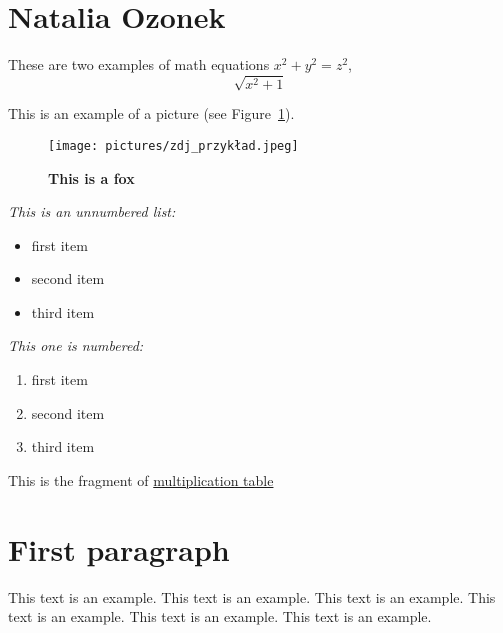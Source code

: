 \section{Natalia Ozonek}
These are two examples of math equations \(x^2 + y^2 = z^2\), \[\sqrt{x^2+1}\] 

This is an example of a picture (see Figure~\ref{fig:fox}).

\begin{figure}[htbp] 
    \centering
    \texttt{[image: pictures/zdj\_przykład.jpeg]}
    \caption{\textbf{This is a fox}}
    \label{fig:fox}
\end{figure}




\textit{This is an unnumbered list:}
\begin{itemize}
    \item first item
    \item second item 
    \item third item
\end{itemize}

\textit{This one is numbered: }  
\begin{enumerate}
    \item first item
    \item second item
    \item third item
\end{enumerate}
This is the fragment of \underline{multiplication table}
\section*{First paragraph}

\begin{flushright}
This text is an example. This text is an example. This text is an example. This text is an example. This text is an example. This text is an example.
\end{flushright}

